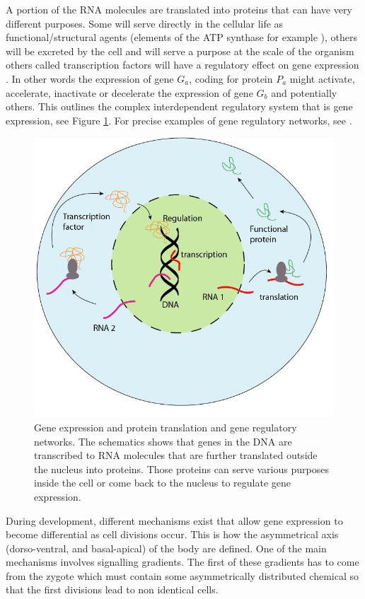 	A portion of the RNA molecules are translated into proteins that can have very different purposes. Some will serve directly in the cellular life as functional/structural agents (elements of the ATP synthase for example \cite{boyer97}), others will be excreted by the cell and will serve a purpose at the scale of the organism \cite{kaiser84} others called transcription factors will have a regulatory effect on gene expression \cite{mitchell89}. In other words the expression of gene $G_a$, coding for protein $P_a$ might activate, accelerate, inactivate or decelerate the expression of gene $G_b$ and potentially others. This outlines the complex interdependent regulatory system that is gene expression, see Figure \ref{fig:cells}. For precise examples of gene regulatory networks, see \cite{gossen92, shinozaki03,fuqua01,balmer02}.\\
	
	
\begin{figure}[bth]
\begin{center}
  \includegraphics[width=0.8\linewidth]{gfx/chapter1/cell.png}
\end{center}
  \caption{Gene expression and protein translation and gene regulatory networks. The schematics shows that genes in the DNA are transcribed to RNA molecules that are further translated outside the nucleus into proteins. Those proteins can serve various purposes inside the cell or come back to the nucleus to regulate gene expression.}
  \label{fig:cells}
\end{figure}
	
	
	
	During development, different mechanisms exist that allow gene expression to become differential as cell divisions occur. This is how the asymmetrical axis (dorso-ventral, and basal-apical) of the body are defined. One of the main mechanisms involves signalling gradients. The first of these gradients has to come from the zygote which must contain some asymmetrically distributed chemical so that the first divisions lead to non identical cells.\\
	
